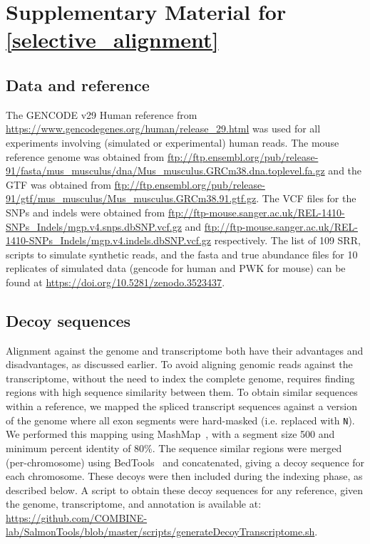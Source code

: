 
\chapter{Supplementary Material for \cref{selective_alignment}} %
\label{appendix-selal}

\section{Data and reference}
\label{subsec:meth_accessions}

The GENCODE v29 Human reference from
\url{https://www.gencodegenes.org/human/release_29.html} was used for all
experiments involving (simulated or experimental) human reads. The mouse
reference genome was obtained from
\url{ftp://ftp.ensembl.org/pub/release-91/fasta/mus_musculus/dna/Mus_musculus.GRCm38.dna.toplevel.fa.gz}
and the GTF was obtained from
\url{ftp://ftp.ensembl.org/pub/release-91/gtf/mus_musculus/Mus_musculus.GRCm38.91.gtf.gz}.
The VCF files for the SNPs and indels were obtained from
\url{ftp://ftp-mouse.sanger.ac.uk/REL-1410-SNPs_Indels/mgp.v4.snps.dbSNP.vcf.gz}
and
\url{ftp://ftp-mouse.sanger.ac.uk/REL-1410-SNPs_Indels/mgp.v4.indels.dbSNP.vcf.gz}
respectively. The list of 109 SRR, scripts to simulate synthetic reads, and the fasta
and true abundance files for 10 replicates of simulated data (gencode for human
and PWK for mouse) can be found at
\url{https://doi.org/10.5281/zenodo.3523437}.

\section{Decoy sequences}
\label{subsec:meth_decoy}

Alignment against the genome and transcriptome both have their advantages and
disadvantages, as discussed earlier. To avoid aligning genomic reads against
the transcriptome, without the need to index the complete genome, requires
finding regions with high sequence similarity between them. To obtain similar
sequences within a reference, we mapped the spliced transcript sequences against
a version of the genome where all exon segments were hard-masked (i.e.\@
replaced with \texttt{N}). We performed this mapping using
MashMap~\cite{jain2018fast}, with a segment size 500 and minimum percent
identity of 80\%. The sequence similar regions were merged (per-chromosome)
using BedTools~\cite{quinlan2010bedtools} and concatenated, giving a decoy
sequence for each chromosome. These decoys were then included during the
\salmon indexing phase, as described below. A script to obtain these decoy
sequences for any reference, given the genome, transcriptome, and annotation
is available at: \url{https://github.com/COMBINE-lab/SalmonTools/blob/master/scripts/generateDecoyTranscriptome.sh}.

